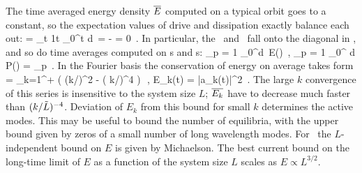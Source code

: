 The time averaged energy density  $\overline{E}$
computed on a typical orbit goes to a constant, so
the expectation values  of drive and dissipation
exactly balance each out:
\beq
      =
    \lim_{t\rightarrow \infty}
        {1\over t} \int_0^t d\tau \, \dot{\expctE}
=
       - 
= 0
    \,.
In particular, the \eqva\
and \reqva\ fall onto the diagonal in ,
and so do time averages computed on \po s and \rpo s:
\beq
{}_p =
{1\over {}} \int_0^d\tau \, E(\tau)
    \,,\qquad
{}_p =
{1\over {}} \int_0^ d\tau \, P(\tau)
    =
      _p
    \,.
\label{poE}
\eeq
In the Fourier basis  the conservation of energy on average
takes form
 = \sum_{k=1}^{+\infty} ( (k/\tildeL)^2 - ( k/\tildeL)^4 )\,
\,,\qquad
E_k(t) =  |a_k(t)|^2
\,.
The large $k$ convergence of this series is insensitive to the
system size $L$; $\overline{E_k}$ have to decrease much faster than
$(k/\tilde{L})^{-4}$.
Deviation of $E_k$ from this bound for small $k$ determines the active modes.
This may be useful to bound the number of equilibria, with
the upper bound given by zeros of a small number
of long wavelength modes.
For \eqva\ the $L$-independent bound
    on $E$ is given by Michaelson. 
The best current bound on the long-time limit
of $E$
as a function of the system size $L$ scales as 
$E \propto L^{3/2}$.
%
%
